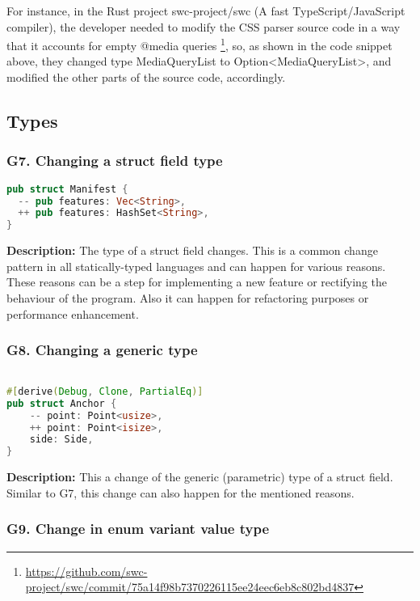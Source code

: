For instance, in the Rust project swc-project/swc (A fast TypeScript/JavaScript compiler), the developer needed to modify the CSS parser source code in a way that it accounts for empty @media queries \footnote{\url{https://github.com/swc-project/swc/commit/75a14f98b7370226115ee24eec6eb8c802bd4837}}, so, as shown in the code snippet above, they changed type MediaQueryList to Option<MediaQueryList>, and modified the other parts of the source code, accordingly.


\subsection{Types}
\subsubsection{G7. Changing a struct field type}

\begin{lstlisting}[language=Rust, style=colouredRust, label={l3}]
pub struct Manifest {
  -- pub features: Vec<String>,
  ++ pub features: HashSet<String>,
}

\end{lstlisting}

\noindent \textbf{Description:} The type of a struct field changes. This is a common change pattern in all statically-typed languages and can happen for various reasons. These reasons can be a step for implementing a new feature or rectifying the behaviour of the program. Also it can happen for refactoring purposes or performance enhancement.

\subsubsection{G8. Changing a generic type}

\begin{lstlisting}[language=Rust, style=colouredRust, label={l3}]

#[derive(Debug, Clone, PartialEq)]
pub struct Anchor {
    -- point: Point<usize>,
    ++ point: Point<isize>,
    side: Side,
}

\end{lstlisting}

\noindent \textbf{Description:} This a change of the generic (parametric) type of a struct field. Similar to G7, this change can also happen for the mentioned reasons.

\subsubsection{G9. Change in enum variant value type}

